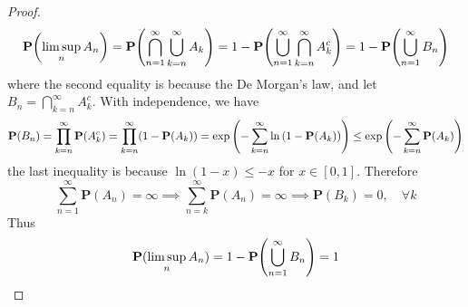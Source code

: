 \begin{proof}
    \begin{equation}
        \mathbf{P}\qty(\limsup_n A_n) = \mathbf{P}\qty(\bigcap_{n=1}^{\infty} \bigcup_{k=n}^{\infty} A_k) = 1 - \mathbf{P}\qty(\bigcup_{n=1}^{\infty} \bigcap_{k=n}^{\infty} A_k^c) = 1 - \mathbf{P}\qty(\bigcup_{n=1}^{\infty} B_n)
    \end{equation}
    where the second equality is because the De Morgan's law, and let $B_n = \bigcap_{k=n}^{\infty} A_k^c$. With independence, we have
    \begin{equation}
        \mathbf{P}(B_n) = \prod_{k=n}^{\infty} \mathbf{P}\qty(A_k^c) = \prod_{k=n}^{\infty} (1 - \mathbf{P}(A_k)) = \exp\qty(- \sum_{k=n}^{\infty} \ln\qty(1 - \mathbf{P}(A_k))) \leq \exp\qty(- \sum_{k=n}^{\infty} \mathbf{P}(A_k))
    \end{equation}
    the last inequality is because $\ln(1 - x) \leq -x$ for $x \in [0, 1]$. Therefore
    \begin{equation}
        \sum_{n=1}^{\infty} \mathbf{P}(A_n) = \infty \implies \sum_{n=k}^{\infty} \mathbf{P}(A_n) = \infty \implies \mathbf{P}(B_k) = 0, \quad \forall k
    \end{equation}
    Thus
    \begin{equation}
        \mathbf{P}(\limsup_n A_n) = 1 - \mathbf{P}\qty(\bigcup_{n=1}^{\infty} B_n) = 1
    \end{equation}
\end{proof}
